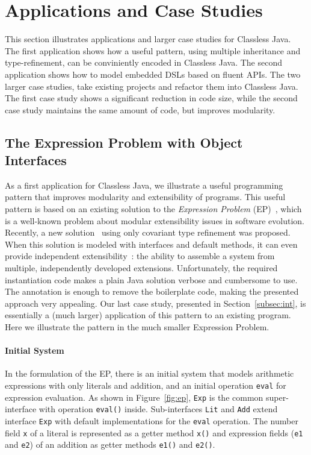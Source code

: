 \section{Applications and Case Studies}

This section illustrates applications and larger case studies for
Classless Java. The first application shows how a useful pattern,
using multiple inheritance and type-refinement, can be conviniently
encoded in Classless Java. The second application shows how to model
embedded DSLs based on fluent APIs. The two larger case studies, take
existing projects and refactor them into Classless Java. The first
case study shows a significant reduction in code size, while the
second case study maintains the same amount of code, but improves
modularity.

\subsection{The Expression Problem with Object Interfaces}\label{subsec:ep}

As a first application for Classless Java, we illustrate a useful
programming pattern that improves modularity and extensibility of
programs. This useful pattern is based on an existing solution to 
the \emph{Expression Problem} (EP)~\cite{wadler98expression}, which is a well-known
problem about modular extensibility issues in software evolution. Recently, a
new solution~\cite{eptrivially} using only covariant type refinement was
proposed. When this solution is modeled with interfaces and default methods, it
can even provide independent extensibility~\cite{zenger05independentlyextensible}: the ability to assemble a system
from multiple, independently developed extensions. Unfortunately, the
required instantiation code makes a plain Java solution verbose and cumbersome
to use. The \mixin annotation is enough to remove the boilerplate code, making
the presented approach very appealing. Our last case study, presented
in Section~\ref{subsec:int}, is essentially a (much larger) application of this
pattern to an existing program. Here we illustrate the pattern in the
much smaller Expression Problem.

\paragraph{Initial System}
In the formulation of the EP, there is an initial system that models
arithmetic expressions with only literals and addition, and an initial
operation \texttt{eval} for expression evaluation.
As shown in Figure~\ref{fig:ep}, \texttt{Exp} is the common
super-interface with operation \texttt{eval()}
inside. Sub-interfaces \texttt{Lit} and \texttt{Add} extend interface
\texttt{Exp} with default implementations for the \texttt{eval} operation. The
number field \texttt{x} of a literal is represented as a getter method
\texttt{x()} and expression fields (\texttt{e1} and \texttt{e2}) of an addition
as getter methods \texttt{e1()} and \texttt{e2()}.

